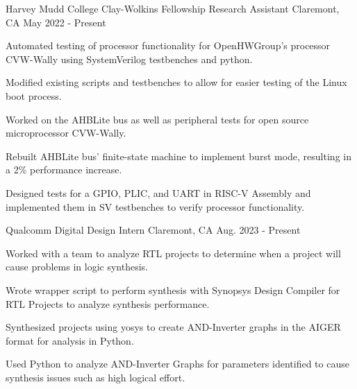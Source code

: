 

\begin{cventries}

  \cventry
    {Harvey Mudd College} %
    {Clay-Wolkins Fellowship Research Assistant} %
    {Claremont, CA} %
    {May 2022 - Present} %
    {
    \begin{cvitems}
      \item {
      Automated testing of processor functionality for OpenHWGroup's processor CVW-Wally using SystemVerilog testbenches and python.
      }
      \item{
      Modified existing scripts and testbenches to allow for easier testing of the Linux boot process.
      }
      \item {
      Worked on the AHBLite bus as well as peripheral tests for open source microprocessor CVW-Wally.
      }
      \item{
      Rebuilt AHBLite bus' finite-state machine to implement burst mode, resulting in a 2\% performance increase.
      }
      \item{
      Designed tests for a GPIO, PLIC, and UART in RISC-V Assembly and implemented them in SV testbenches to verify processor functionality.
      }
    \end{cvitems}
    }

  \cventry
    {Qualcomm} %
    {Digital Design Intern} %
    {Claremont, CA} %
    {Aug. 2023 - Present} %
    {
    \begin{cvitems}
      \item{
      Worked with a team to analyze RTL projects to determine when a project will cause problems in logic synthesis.
      }
      \item{
      Wrote wrapper script to perform synthesis with Synopsys Design Compiler for RTL Projects to analyze synthesis performance.
      }
      \item{
      Synthesized projects using yosys to create AND-Inverter graphs in the AIGER format for analysis in Python.
      }
      \item{
      Used Python to analyze AND-Inverter Graphs for parameters identified to cause synthesis issues such as high logical effort.
      }
    \end{cvitems}
    }


\end{cventries}
